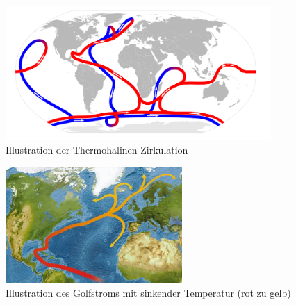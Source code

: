 \documentclass[11pt, a4paper]{article}
\begin{document}
\begin{figure}[h!]
	\centering
	\includegraphics[width=0.9\textwidth]{images/thermo}
	\caption{Illustration der Thermohalinen Zirkulation \cite{thermo-image}}
\end{figure}

\begin{figure}[h!]
	\centering
	\includegraphics[width=0.6\textwidth]{images/golf}
	\caption{Illustration des Golfstroms mit sinkender Temperatur (rot zu gelb) \cite{golf-image}}
\end{figure}
\newpage
\nocite{*}

{}
\end{document}
